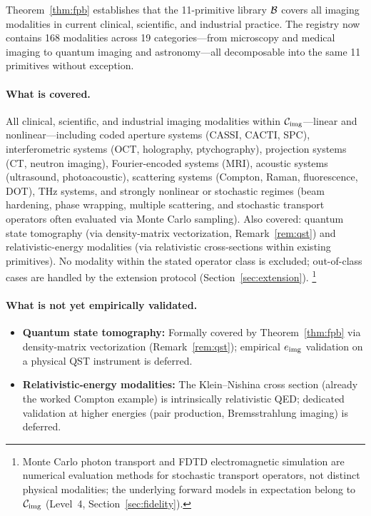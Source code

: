 \documentclass[11pt]{article}
\begin{document}
Theorem~\ref{thm:fpb} establishes that the 11-primitive library $\mathcal{B}$ covers all imaging modalities in current clinical, scientific, and industrial practice. The registry now contains 168 modalities across 19 categories---from microscopy and medical imaging to quantum imaging and astronomy---all decomposable into the same 11 primitives without exception.

\paragraph{What is covered.}
All clinical, scientific, and industrial imaging modalities within $\mathcal{C}_{\mathrm{img}}$---linear and nonlinear---including coded aperture systems (CASSI, CACTI, SPC), interferometric systems (OCT, holography, ptychography), projection systems (CT, neutron imaging), Fourier-encoded systems (MRI), acoustic systems (ultrasound, photoacoustic), scattering systems (Compton, Raman, fluorescence, DOT), THz systems, and strongly nonlinear or stochastic regimes (beam hardening, phase wrapping, multiple scattering, and stochastic transport operators often evaluated via Monte Carlo sampling). Also covered: quantum state tomography (via density-matrix vectorization, Remark~\ref{rem:qst}) and relativistic-energy modalities (via relativistic cross-sections within existing primitives). No modality within the stated operator class is excluded; out-of-class cases are handled by the extension protocol (Section~\ref{sec:extension}).%
\footnote{Monte Carlo photon transport and FDTD electromagnetic simulation are numerical evaluation methods for stochastic transport operators, not distinct physical modalities; the underlying forward models in expectation belong to $\mathcal{C}_{\mathrm{img}}$ (Level~4, Section~\ref{sec:fidelity}).}

\paragraph{What is not yet empirically validated.}
\begin{itemize}
  \item \textbf{Quantum state tomography:} Formally covered by Theorem~\ref{thm:fpb} via density-matrix vectorization (Remark~\ref{rem:qst}); empirical $e_{\mathrm{img}}$ validation on a physical QST instrument is deferred.
  \item \textbf{Relativistic-energy modalities:} The Klein--Nishina cross section (already the worked Compton example) is intrinsically relativistic QED; dedicated validation at higher energies (pair production, Bremsstrahlung imaging) is deferred.
\end{itemize}
\end{document}

